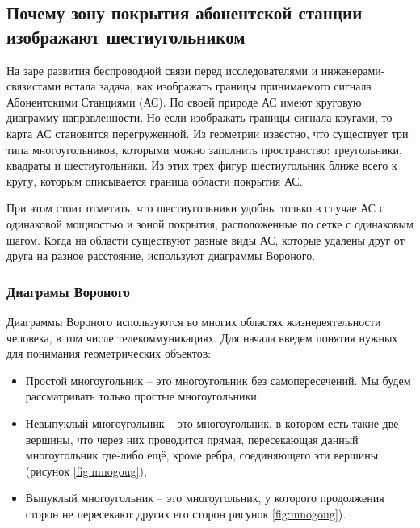 \subsection{Почему зону покрытия абонентской станции изображают шестиугольником}



На заре развития беспроводной связи перед исследователями и инженерами-связистами встала задача, как изображать границы принимаемого сигнала Абонентскими Станциями (АС). По своей природе АС имеют круговую диаграмму направленности. Но если изображать границы сигнала кругами, то карта АС становится перегруженной. Из геометрии известно, что существует три типа многоугольников, которыми можно заполнить пространство: треугольники, квадраты и шестиугольники. Из этих трех фигур шестиугольник ближе всего к кругу, которым описывается граница области покрытия АС. 

При этом стоит отметить, что шестиугольники удобны только в случае АС с одинаковой мощностью и зоной покрытия, расположенные по сетке с одинаковым шагом. Когда на области существуют разные виды АС, которые удалены друг от друга на разное расстояние, используют диаграммы Вороного. 

\subsubsection{Диаграмы Вороного}

Диаграммы Вороного используются во многих областях жизнедеятельности человека, в том числе телекоммуникациях. Для начала введем понятия нужных для понимания геометрических объектов:

\begin{itemize}
	\item Простой многоугольник -- это многоугольник без самопересечений. Мы будем рассматривать только простые многоугольники.
	\item Невыпуклый многоугольник -- это многоугольник, в котором есть такие две вершины, что через них проводится прямая, пересекающая данный многоугольник где-либо ещё, кроме ребра, соединяющего эти вершины (рисунок \ref{fig:mnogoug}), 
	\item Выпуклый многоугольник -- это многоугольник, у которого продолжения сторон не пересекают других его сторон рисунок \ref{fig:mnogoug}).
\end{itemize}

